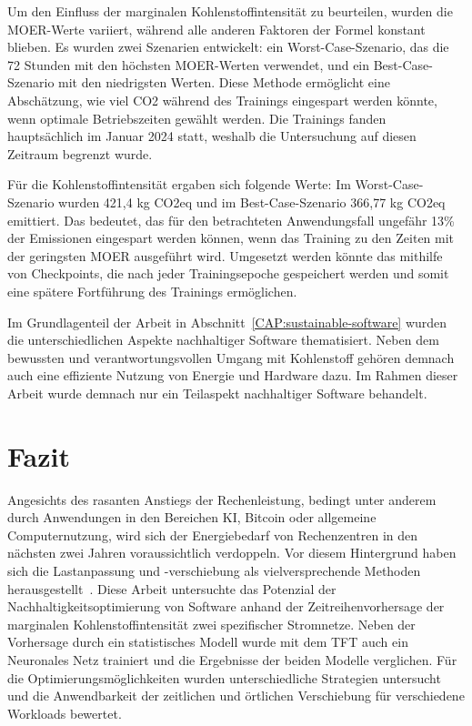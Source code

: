 Um den Einfluss der marginalen Kohlenstoffintensität zu beurteilen, wurden die \ac{MOER}-Werte variiert, während alle anderen Faktoren der Formel konstant blieben.
Es wurden zwei Szenarien entwickelt: ein Worst-Case-Szenario, das die 72 Stunden mit den höchsten \ac{MOER}-Werten verwendet, und ein Best-Case-Szenario mit den niedrigsten Werten.
Diese Methode ermöglicht eine Abschätzung, wie viel \ac{CO2} während des Trainings eingespart werden könnte, wenn optimale Betriebszeiten gewählt werden.
Die Trainings fanden hauptsächlich im Januar 2024 statt, weshalb die Untersuchung auf diesen Zeitraum begrenzt wurde.

Für die Kohlenstoffintensität ergaben sich folgende Werte:
Im Worst-Case-Szenario wurden 421,4 kg \ac{CO2}eq und im Best-Case-Szenario 366,77 kg \ac{CO2}eq emittiert.
Das bedeutet, das für den betrachteten Anwendungsfall ungefähr 13\% der Emissionen eingespart werden können, wenn das Training zu den Zeiten mit der geringsten \ac{MOER} ausgeführt wird.
Umgesetzt werden könnte das mithilfe von Checkpoints, die nach jeder Trainingsepoche gespeichert werden und somit eine spätere Fortführung des Trainings ermöglichen.

Im Grundlagenteil der Arbeit in Abschnitt~\ref{CAP:sustainable-software} wurden die unterschiedlichen Aspekte nachhaltiger Software thematisiert.
Neben dem bewussten und verantwortungsvollen Umgang mit Kohlenstoff gehören demnach auch eine effiziente Nutzung von Energie und Hardware dazu.
Im Rahmen dieser Arbeit wurde demnach nur ein Teilaspekt nachhaltiger Software behandelt.
\chapter{Fazit}\label{CAP:resumee}
Angesichts des rasanten Anstiegs der Rechenleistung, bedingt unter anderem durch Anwendungen in den Bereichen \ac{KI}, Bitcoin oder allgemeine Computernutzung, wird sich der Energiebedarf von Rechenzentren in den nächsten zwei Jahren voraussichtlich verdoppeln.
Vor diesem Hintergrund haben sich die Lastanpassung und -verschiebung als vielversprechende Methoden herausgestellt~\cite{WattTime.12.3.2024}.
Diese Arbeit untersuchte das Potenzial der Nachhaltigkeitsoptimierung von Software anhand der Zeitreihenvorhersage der marginalen Kohlenstoffintensität zwei spezifischer Stromnetze.
Neben der Vorhersage durch ein statistisches Modell wurde mit dem \ac{TFT} auch ein Neuronales Netz trainiert und die Ergebnisse der beiden Modelle verglichen.
Für die Optimierungsmöglichkeiten wurden unterschiedliche Strategien untersucht und die Anwendbarkeit der zeitlichen und örtlichen Verschiebung für verschiedene Workloads bewertet.

